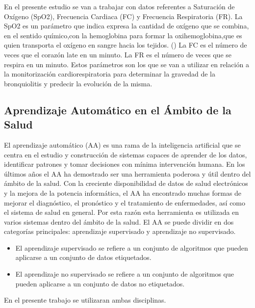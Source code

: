 En el presente estudio se van a trabajar con datos referentes a Saturación de Oxígeno (SpO2), Frecuencia Cardiaca (FC) y Frecuencia Respiratoria (FR). La SpO2 es un parámetro que indica expresa la cantidad de oxígeno que se combina, en el sentido químico,con la hemoglobina para formar la oxihemoglobina,que es quien transporta el oxígeno en sangre hacia los tejidos. (\cite{Laborde2004}) La FC es el número de veces que el corazón late en un minuto. La FR es el número de veces que se respira en un minuto. Estos parámetros son los que se van a utilizar en relación a la monitorización cardiorespiratoria para determinar la gravedad de la bronquiolitis y predecir la evolución de la misma.


\subsection{Aprendizaje Automático en el Ámbito de la Salud}

El aprendizaje automático (AA) es una rama de la inteligencia artificial que se centra en el estudio y construcción de sistemas capaces de aprender de los datos, identificar patrones y tomar decisiones con mínima intervención humana. En los últimos años el AA ha demostrado ser una herramienta poderosa y útil dentro del ámbito de la salud. Con la creciente disponibilidad de datos de salud electrónicos y la mejora de la potencia informática, el AA ha encontrado muchas formas de mejorar el diagnóstico, el pronóstico y el tratamiento de enfermedades, así como el sistema de salud en general. Por esta razón esta herramienta es utilizada en varios sistemas dentro del ámbito de la salud. El AA se puede dividir en dos categorías principales: aprendizaje supervisado y aprendizaje no supervisado.

\begin{itemize}
    \item El aprendizaje supervisado se refiere a un conjunto de algoritmos que pueden aplicarse a un conjunto de datos etiquetados. 
    \item El aprendizaje no supervisado se refiere a un conjunto de algoritmos que pueden aplicarse a un conjunto de datos no etiquetados.
\end{itemize}

En el presente trabajo se utilizaran ambas disciplinas.











